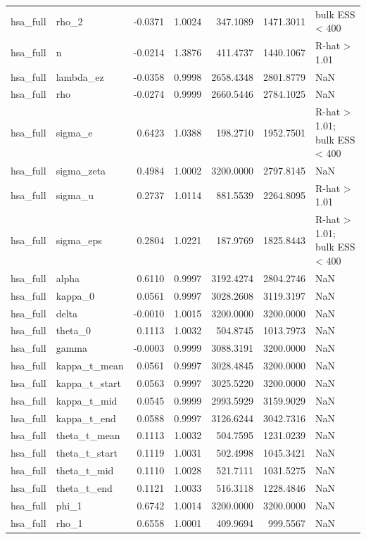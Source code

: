 \begin{tabular}{llrrrrl}
hsa\_full & rho\_2 & -0.0371 & 1.0024 & 347.1089 & 1471.3011 & bulk ESS < 400 \\
hsa\_full & n & -0.0214 & 1.3876 & 411.4737 & 1440.1067 & R-hat > 1.01 \\
hsa\_full & lambda\_ez & -0.0358 & 0.9998 & 2658.4348 & 2801.8779 & NaN \\
hsa\_full & rho & -0.0274 & 0.9999 & 2660.5446 & 2784.1025 & NaN \\
hsa\_full & sigma\_e & 0.6423 & 1.0388 & 198.2710 & 1952.7501 & R-hat > 1.01; bulk ESS < 400 \\
hsa\_full & sigma\_zeta & 0.4984 & 1.0002 & 3200.0000 & 2797.8145 & NaN \\
hsa\_full & sigma\_u & 0.2737 & 1.0114 & 881.5539 & 2264.8095 & R-hat > 1.01 \\
hsa\_full & sigma\_eps & 0.2804 & 1.0221 & 187.9769 & 1825.8443 & R-hat > 1.01; bulk ESS < 400 \\
hsa\_full & alpha & 0.6110 & 0.9997 & 3192.4274 & 2804.2746 & NaN \\
hsa\_full & kappa\_0 & 0.0561 & 0.9997 & 3028.2608 & 3119.3197 & NaN \\
hsa\_full & delta & -0.0010 & 1.0015 & 3200.0000 & 3200.0000 & NaN \\
hsa\_full & theta\_0 & 0.1113 & 1.0032 & 504.8745 & 1013.7973 & NaN \\
hsa\_full & gamma & -0.0003 & 0.9999 & 3088.3191 & 3200.0000 & NaN \\
hsa\_full & kappa\_t\_mean & 0.0561 & 0.9997 & 3028.4845 & 3200.0000 & NaN \\
hsa\_full & kappa\_t\_start & 0.0563 & 0.9997 & 3025.5220 & 3200.0000 & NaN \\
hsa\_full & kappa\_t\_mid & 0.0545 & 0.9999 & 2993.5929 & 3159.9029 & NaN \\
hsa\_full & kappa\_t\_end & 0.0588 & 0.9997 & 3126.6244 & 3042.7316 & NaN \\
hsa\_full & theta\_t\_mean & 0.1113 & 1.0032 & 504.7595 & 1231.0239 & NaN \\
hsa\_full & theta\_t\_start & 0.1119 & 1.0031 & 502.4998 & 1045.3421 & NaN \\
hsa\_full & theta\_t\_mid & 0.1110 & 1.0028 & 521.7111 & 1031.5275 & NaN \\
hsa\_full & theta\_t\_end & 0.1121 & 1.0033 & 516.3118 & 1228.4846 & NaN \\
hsa\_full & phi\_1 & 0.6742 & 1.0014 & 3200.0000 & 3200.0000 & NaN \\
hsa\_full & rho\_1 & 0.6558 & 1.0001 & 409.9694 & 999.5567 & NaN \\

\end{tabular}
